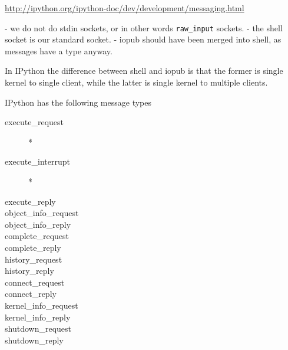 \url{http://ipython.org/ipython-doc/dev/development/messaging.html}

- we do not do stdin sockets, or in other words \verb|raw_input| sockets.
- the shell socket is our standard socket. 
- iopub should have been merged into shell, as messages have a type
  anyway. 

In IPython the difference between shell and iopub is that the former
is single kernel to single client, while the latter is single kernel
to multiple clients. 

IPython has the following message types
\begin{description}
\item[execute\_request] *
\item[execute\_interrupt] *
\item[execute\_reply] 
\item[object\_info\_request]
\item[object\_info\_reply]
\item[complete\_request]
\item[complete\_reply]
\item[history\_request]
\item[history\_reply]
\item[connect\_request]
\item[connect\_reply]
\item[kernel\_info\_request]
\item[kernel\_info\_reply]
\item[shutdown\_request]
\item[shutdown\_reply]
\end{description}


